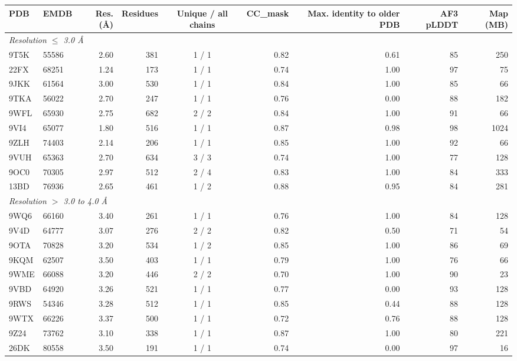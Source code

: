\begin{tabular}{llrrcrrrr}
\toprule
PDB & EMDB & Res. (\AA) & Residues & Unique / all chains & CC\_mask & Max. identity to older PDB & AF3 pLDDT & Map (MB) \\
\midrule
\multicolumn{9}{l}{\emph{Resolution $\leq$ 3.0 \AA}} \\
9T5K & 55586 & 2.60 & 381 & 1 / 1 & 0.82 & 0.61 & 85 & 250 \\
22FX & 68251 & 1.24 & 173 & 1 / 1 & 0.74 & 1.00 & 97 & 75 \\
9JKK & 61564 & 3.00 & 530 & 1 / 1 & 0.84 & 1.00 & 85 & 66 \\
9TKA & 56022 & 2.70 & 247 & 1 / 1 & 0.76 & 0.00 & 88 & 182 \\
9WFL & 65930 & 2.75 & 682 & 2 / 2 & 0.84 & 1.00 & 91 & 66 \\
9VI4 & 65077 & 1.80 & 516 & 1 / 1 & 0.87 & 0.98 & 98 & 1024 \\
9ZLH & 74403 & 2.14 & 206 & 1 / 1 & 0.85 & 1.00 & 92 & 66 \\
9VUH & 65363 & 2.70 & 634 & 3 / 3 & 0.74 & 1.00 & 77 & 128 \\
9OC0 & 70305 & 2.97 & 512 & 2 / 4 & 0.83 & 1.00 & 84 & 333 \\
13BD & 76936 & 2.65 & 461 & 1 / 2 & 0.88 & 0.95 & 84 & 281 \\
\midrule
\multicolumn{9}{l}{\emph{Resolution $>$ 3.0 to 4.0 \AA}} \\
9WQ6 & 66160 & 3.40 & 261 & 1 / 1 & 0.76 & 1.00 & 84 & 128 \\
9V4D & 64777 & 3.07 & 276 & 2 / 2 & 0.82 & 0.50 & 71 & 54 \\
9OTA & 70828 & 3.20 & 534 & 1 / 2 & 0.85 & 1.00 & 86 & 69 \\
9KQM & 62507 & 3.50 & 403 & 1 / 1 & 0.79 & 1.00 & 76 & 66 \\
9WME & 66088 & 3.20 & 446 & 2 / 2 & 0.70 & 1.00 & 90 & 23 \\
9VBD & 64920 & 3.26 & 521 & 1 / 1 & 0.77 & 0.00 & 93 & 128 \\
9RWS & 54346 & 3.28 & 512 & 1 / 1 & 0.85 & 0.44 & 88 & 128 \\
9WTX & 66226 & 3.37 & 500 & 1 / 1 & 0.72 & 0.76 & 88 & 128 \\
9Z24 & 73762 & 3.10 & 338 & 1 / 1 & 0.87 & 1.00 & 80 & 221 \\
26DK & 80558 & 3.50 & 191 & 1 / 1 & 0.74 & 0.00 & 97 & 16 \\
\bottomrule
\end{tabular}
